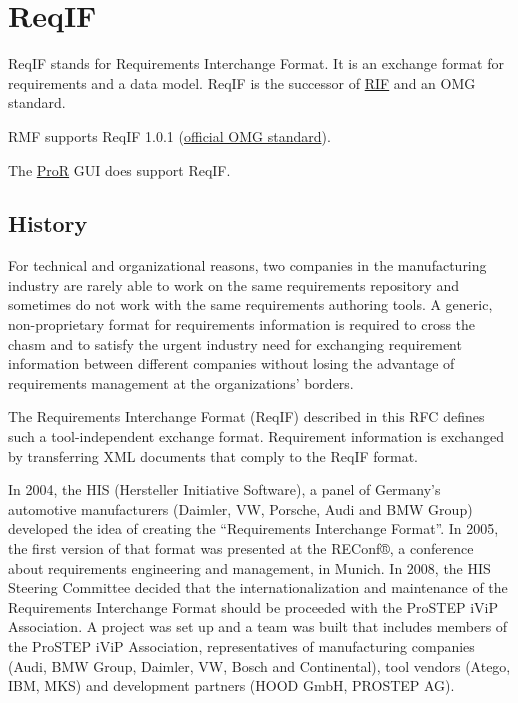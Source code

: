 % 

\section{ReqIF}

ReqIF stands for Requirements Interchange Format.  It is an exchange format for requirements and a data model.  ReqIF is the successor of \href{RMF/RIF}{RIF} and an OMG standard.

RMF supports ReqIF 1.0.1 (\href{http://www.omg.org/spec/ReqIF/}{official OMG standard}).

The \href{RMF/ProR}{ProR} GUI does support ReqIF.

\subsection{History}

For technical and organizational reasons, two companies in the manufacturing industry are rarely able to work on the same requirements repository and sometimes do not work with the same requirements authoring tools.  A generic, non-proprietary format for requirements information is required to cross the chasm and to satisfy the urgent industry need for exchanging requirement information between different companies without losing the advantage of requirements management at the organizations' borders.

The Requirements Interchange Format (ReqIF) described in this RFC defines such a tool-independent exchange format.  Requirement information is exchanged by transferring XML documents that comply to the ReqIF format.

In 2004, the HIS (Hersteller Initiative Software), a panel of Germany's automotive manufacturers (Daimler, VW, Porsche, Audi and BMW Group) developed the idea of creating the ``Requirements Interchange Format''.  In 2005, the first version of that format was presented at the REConf®, a conference about requirements engineering and management, in Munich.  In 2008, the HIS Steering Committee decided that the internationalization and maintenance of the Requirements Interchange Format should be proceeded with the ProSTEP iViP Association.  A project was set up and a team was built that includes members of the ProSTEP iViP Association, representatives of manufacturing companies (Audi, BMW  Group, Daimler, VW, Bosch and Continental), tool vendors (Atego, IBM, MKS) and development partners (HOOD GmbH, PROSTEP AG).

